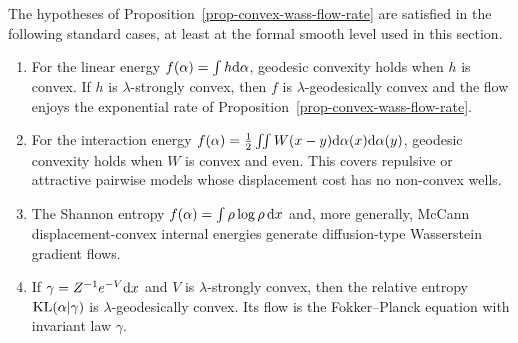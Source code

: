 \begin{prop}\label{prop-convex-flow-examples}
	The hypotheses of Proposition~\ref{prop-convex-wass-flow-rate} are satisfied in the following standard cases, at least at the formal smooth level used in this section.
	\begin{enumerate}
		\item For the linear energy $f(\alpha)=\int h\mathrm{d}\alpha$, geodesic convexity holds when $h$ is convex. If $h$ is $\lambda$-strongly convex, then $f$ is $\lambda$-geodesically convex and the flow enjoys the exponential rate of Proposition~\ref{prop-convex-wass-flow-rate}.
		\item For the interaction energy $f(\alpha)=\frac12\iint W(x-y)\mathrm{d}\alpha(x)\mathrm{d}\alpha(y)$, geodesic convexity holds when $W$ is convex and even. This covers repulsive or attractive pairwise models whose displacement cost has no non-convex wells.
		\item The Shannon entropy $f(\alpha)=\int\rho\log\rho\,\mathrm{d} x$ and, more generally, McCann displacement-convex internal energies generate diffusion-type Wasserstein gradient flows.
		\item If $\gamma=Z^{-1}e^{-V}\mathrm{d} x$ and $V$ is $\lambda$-strongly convex, then the relative entropy $\operatorname{KL}(\alpha|\gamma)$ is $\lambda$-geodesically convex. Its flow is the Fokker--Planck equation with invariant law $\gamma$.
	\end{enumerate}
\end{prop}

